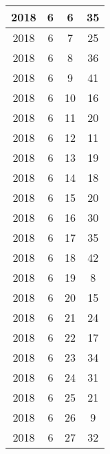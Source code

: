 \begin{longtable} {|c|c|c|c|}
\hline
2018         & 6            & 6            & 35                        \\ 
\hline
2018         & 6            & 7            & 25                        \\ 
\hline
2018         & 6            & 8            & 36                        \\ 
\hline
2018         & 6            & 9            & 41                        \\ 
\hline
2018         & 6            & 10           & 16                        \\ 
\hline
2018         & 6            & 11           & 20                        \\ 
\hline
2018         & 6            & 12           & 11                        \\ 
\hline
2018         & 6            & 13           & 19                        \\ 
\hline
2018         & 6            & 14           & 18                        \\ 
\hline
2018         & 6            & 15           & 20                        \\ 
\hline
2018         & 6            & 16           & 30                        \\ 
\hline
2018         & 6            & 17           & 35                        \\ 
\hline
2018         & 6            & 18           & 42                        \\ 
\hline
2018         & 6            & 19           & 8                         \\ 
\hline
2018         & 6            & 20           & 15                        \\ 
\hline
2018         & 6            & 21           & 24                        \\ 
\hline
2018         & 6            & 22           & 17                        \\ 
\hline
2018         & 6            & 23           & 34                        \\ 
\hline
2018         & 6            & 24           & 31                        \\ 
\hline
2018         & 6            & 25           & 21                        \\ 
\hline
2018         & 6            & 26           & 9                         \\ 
\hline
2018         & 6            & 27           & 32                        \\ 

\end{longtable}

